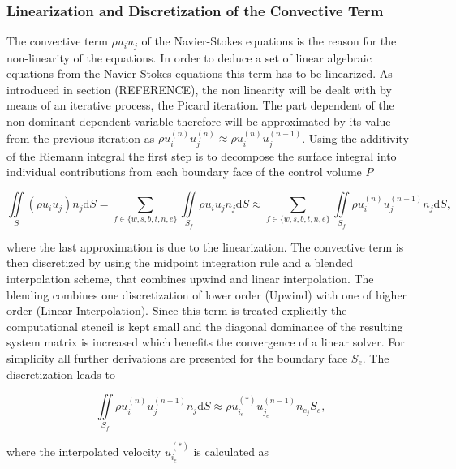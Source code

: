       \subsubsection{Linearization and Discretization of the Convective Term}

      The convective term \(\rho u_i u_j\) of the Navier-Stokes equations is the reason for the non-linearity of the equations. In order to deduce a set of linear algebraic equations from the Navier-Stokes equations this term has to be linearized. As introduced in section (REFERENCE), the non linearity will be dealt with by means of an iterative process, the Picard iteration. The part dependent of the non dominant dependent variable therefore will be approximated by its value from the previous iteration as \( \rho u_i^{(n)} u_j^{(n)} \approx \rho u_i^{(n)} u_j^{(n-1)} \). Using the additivity of the Riemann integral the first step is to decompose the surface integral into individual contributions from each boundary face of the control volume \(P\)
      
      \begin{displaymath}
      \iint\limits_S (\rho u_i u_j)n_j \mathrm{d}S
      = \sum_{f \in \{w,s,b,t,n,e\}} \iint\limits_{S_f}\rho u_{i} u_{j} n_{j} \mathrm{d}S
      \approx \sum_{f \in \{w,s,b,t,n,e\}} \iint\limits_{S_f} \rho u_{i}^{(n)} u_{j}^{(n-1)} n_{j} \mathrm{d}S,
      \end{displaymath}

      where the last approximation is due to the linearization. The convective term is then discretized by using the midpoint integration rule and a blended interpolation scheme, that combines upwind and linear interpolation. The blending combines one discretization of lower order (Upwind) with one of higher order (Linear Interpolation). Since this term is treated explicitly the computational stencil is kept small and the diagonal dominance of the resulting system matrix is increased which benefits the convergence of a linear solver. For simplicity all further derivations are presented for the boundary face \(S_e\). The discretization leads to

      \begin{displaymath}
        \iint\limits_{S_f} \rho u_{i}^{(n)} u_{j}^{(n-1)} n_{j} \mathrm{d}S 
        \approx \rho u_{i_e}^{(*)} u_{j_e}^{(n-1)} n_{e_j} S_e,  
      \end{displaymath}

      where the interpolated velocity \(u_{i_e}^{(*)}\) is calculated as

